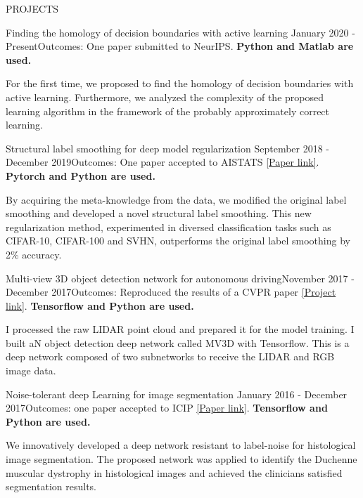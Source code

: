 \documentclass{resume} %
\begin{document}
\vspace{-0.1cm}
\begin{rSection}{PROJECTS}
\begin{rSubsection}{Finding the homology of decision boundaries with active learning} {January 2020 - Present}{Outcomes: One paper submitted to NeurIPS. \textbf{Python and Matlab are used.}}{}
\item For the first time, we proposed to find the homology of decision boundaries with active learning. Furthermore, we analyzed the complexity of the proposed learning algorithm in the framework of the probably approximately correct learning.
\end{rSubsection}  
\vspace{-0.1cm}
\begin{rSubsection}{Structural label smoothing for  deep model regularization} {September 2018 - December 2019}{Outcomes: One paper accepted to AISTATS \href{http://proceedings.mlr.press/v108/li20e/li20e.pdf}{[Paper link]}. \textbf{Pytorch and Python are used.}}{}
\item By acquiring the meta-knowledge from the data, we modified the original label smoothing and developed a novel structural label smoothing. This new regularization method, experimented in diversed classification tasks such as CIFAR-10, CIFAR-100 and SVHN, outperforms the original label smoothing by  2\% accuracy.

\end{rSubsection}  
\begin{rSubsection}{Multi-view 3D object detection network for autonomous driving}{November 2017 - December 2017}{Outcomes: Reproduced the results of a CVPR paper \href{https://github.com/wayne0908/Multi-View-3D-Object-Detection-Network-for-Autonomous-Driving}{[Project link]}. \textbf{Tensorflow and Python are used.}}{} 
\item I processed the raw LIDAR point cloud and prepared it for the model training. I built aN object detection deep network called MV3D with Tensorflow. This is a deep network composed of two subnetworks to receive the LIDAR and RGB image data. \end{rSubsection}
\vspace{-0.1cm}
\begin{rSubsection}{Noise-tolerant deep Learning for image segmentation} {January 2016 - December 2017}{Outcomes: one paper accepted to ICIP \href{https://ieeexplore.ieee.org/stamp/stamp.jsp?tp=&arnumber=8296848}{[Paper link]}. \textbf{Tensorflow and Python are used.}}{}
\item We innovatively developed a deep network resistant to label-noise for histological image segmentation. The proposed network was applied to identify the Duchenne muscular dystrophy in histological images and achieved the clinicians satisfied segmentation results.
\end{rSubsection}  
\vspace{-0.1cm}


\end{rSection}
\end{document}
